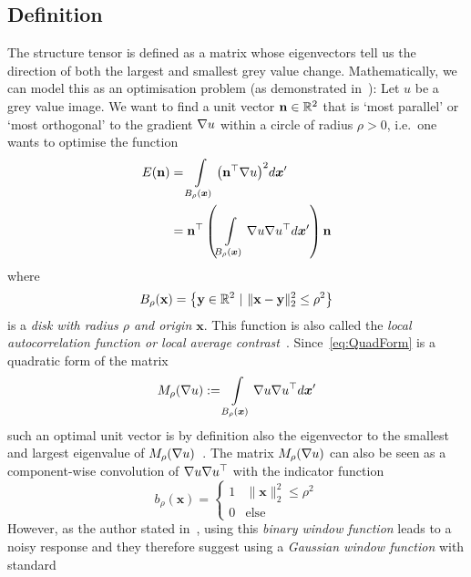 \subsection{Definition}
The structure tensor is defined as a matrix whose eigenvectors tell us the direction of
both the largest and smallest grey value change. Mathematically, we can model this
as an optimisation problem (as demonstrated in~\cite{ipcv}):\newpage\noindent
Let $u$ be a grey value image.
We want to find a unit vector $\mathbf{n} \in \mathbb{R}^2$ that is `most parallel' or `most orthogonal' to the
gradient $\mathbf{\nabla} u$ within a circle of radius $\rho > 0$, i.e.\ one wants to optimise the
function
\begin{align}
    E(\mathbf{n}) &= \int\limits_{B_\rho(\boldsymbol x)} {\left(\mathbf{n}^\top\mathbf{\nabla}
    u\right)}^2d\boldsymbol x'\\
    &= \mathbf{n}^\top \left(\int\limits_{B_\rho(\boldsymbol x)} \mathbf{\nabla} u \mathbf{\nabla}
        u^\top d\boldsymbol x' \right) \mathbf{n}\label{eq:QuadForm}
\end{align}
where
\begin{equation}
    B_\rho( \mathbf{x} ) = \left\lbrace \mathbf{y}\in\mathbb{R}^2\ \vert\ \lVert \mathbf{x} - \mathbf{y}
    \rVert_2^2 \leq \rho^2 \right\rbrace
\end{equation}
is a \textit{disk with radius $\rho$ and origin $ \mathbf{x}$}.
This function is also called the \textit{local autocorrelation function or local average
    contrast}~\cite{harris88, ipcv}.
Since~\eqref{eq:QuadForm} is a quadratic form of the matrix
\begin{equation}
    M_\rho(\mathbf{\nabla} u) := \int\limits_{B_\rho(\boldsymbol x)} \mathbf{\nabla} u \mathbf{\nabla}
    u^\top d\boldsymbol x'
\end{equation}
such an optimal unit vector is by definition also the eigenvector to the smallest and largest
eigenvalue of $M_\rho(\mathbf{\nabla} u)$~\cite{ipcv}.
The matrix $M_\rho(\mathbf{\nabla} u)$ can also be seen as a component-wise convolution of 
$\mathbf{\nabla} u\mathbf{\nabla} u^\top$ with the indicator function
\begin{equation}
    b_\rho(\boldsymbol x) = \begin{cases} 1 & \lVert \boldsymbol x\rVert_2^2 \leq \rho^2\\ 0 & \text{else} \end{cases}
\end{equation}
However, as the author stated in~\cite{harris88}, using this \textit{binary window function} leads
to a noisy response and they therefore suggest using a \textit{Gaussian window function} with standard
